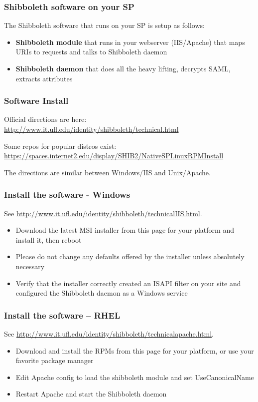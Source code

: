 \begin{frame}
\frametitle{Shibboleth software on your SP}
The Shibboleth software that runs on your SP is setup as follows:
\begin{itemize}
\item \textbf{Shibboleth module} that runs in your webserver (IIS/Apache) that maps URIs to requests and talks to Shibboleth daemon
\item \textbf{Shibboleth daemon} that does all the heavy lifting, decrypts SAML, extracts attributes
\end{itemize}
\end{frame}

\begin{frame}
\frametitle{Software Install}
Official directions are here: \\
{\small \url{http://www.it.ufl.edu/identity/shibboleth/technical.html}}

\bigskip
Some repos for popular distros exist: \\
{\small \url{https://spaces.internet2.edu/display/SHIB2/NativeSPLinuxRPMInstall}}

\bigskip
The directions are similar between Windows/IIS and Unix/Apache.
\end{frame}

\begin{frame}
\frametitle{Install the software - Windows}
{\tiny See \url{http://www.it.ufl.edu/identity/shibboleth/technicalIIS.html}.}

\begin{itemize}
\item Download the latest MSI installer from this page for your platform and install it, then reboot
\item Please do not change any defaults offered by the installer unless absolutely necessary
\item Verify that the installer correctly created an ISAPI filter on your site and configured the Shibboleth daemon as a Windows service
\end{itemize}

\end{frame}

\begin{frame}
\frametitle{Install the software – RHEL}
{\tiny See \url{http://www.it.ufl.edu/identity/shibboleth/technicalapache.html}.}

\begin{itemize}
\item Download and install the RPMs from this page for your platform, or use your favorite package manager
\item Edit Apache config to load the shibboleth module and set UseCanonicalName
\item Restart Apache and start the Shibboleth daemon
\end{itemize}

\end{frame}

